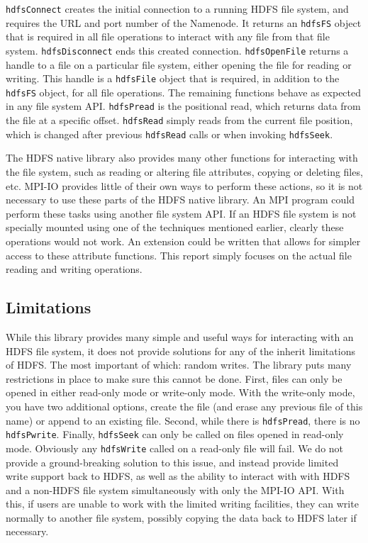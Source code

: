 \texttt{hdfsConnect} creates the initial connection to a running HDFS file
system, and requires the URL and port number of the Namenode. It returns an \texttt{hdfsFS} object
that is required in all file operations to interact with any file from that file
system. \texttt{hdfsDisconnect} ends this created connection.
\texttt{hdfsOpenFile} returns a handle to a file on a particular file system,
either opening the file for reading or writing. This handle is a
\texttt{hdfsFile} object that is required, in addition to the \texttt{hdfsFS}
object, for all file operations. The remaining functions behave as expected in
any file system API. \texttt{hdfsPread} is the positional read, which returns
data from the file at a specific offset. \texttt{hdfsRead} simply reads from the
current file position, which is changed after previous \texttt{hdfsRead} calls
or when invoking \texttt{hdfsSeek}.

The HDFS native library also provides many other functions for interacting with
the file system, such as reading or altering file attributes, copying or
deleting files, etc. MPI-IO provides little of their own ways to perform these
actions, so it is not necessary to use these parts of the HDFS native library.
An MPI program could perform these tasks using another file system API. If an
HDFS file system is not specially mounted using one of the techniques mentioned
earlier, clearly these operations would not work. An extension could be written
that allows for simpler access to these attribute functions. This
report simply
focuses on the actual file reading and writing operations.

\subsection{Limitations}
While this library provides many simple and useful ways for interacting with an
HDFS file system, it does not provide solutions for any of the inherit
limitations of HDFS. The most important of which: random writes. The library
puts many restrictions in place to make sure this cannot be done. First, files
can only be opened in either read-only mode or write-only mode. With the
write-only mode, you have two additional options, create the file (and erase any
previous file of this name) or append to an existing file. Second, while there
is \texttt{hdfsPread}, there is no \texttt{hdfsPwrite}. Finally,
\texttt{hdfsSeek} can only be called on files opened in read-only mode.
Obviously any \texttt{hdfsWrite} called on a read-only file will fail. We do not
provide a ground-breaking solution to this issue, and instead provide limited
write support back to HDFS, as well as the ability to interact with with HDFS
and a non-HDFS file system simultaneously with only the MPI-IO API. With this,
if users are unable to work with the limited writing facilities, they can write
normally to another file system, possibly copying the data back to HDFS later if
necessary.

